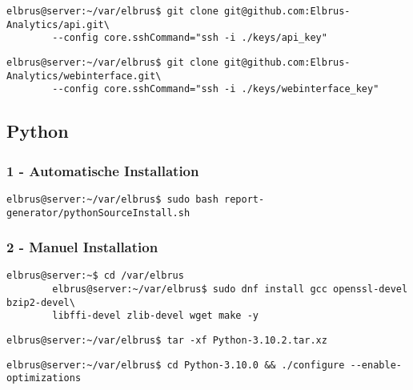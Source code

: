 \documentclass{article}
\begin{document}
	\begin{lstlisting}[caption={Clonen der API Software.}]
		elbrus@server:~/var/elbrus$ git clone git@github.com:Elbrus-Analytics/api.git\
		--config core.sshCommand="ssh -i ./keys/api_key"
	\end{lstlisting}

	\begin{lstlisting}[caption={Clonen der Packet-Importer Software}]
		elbrus@server:~/var/elbrus$ git clone git@github.com:Elbrus-Analytics/webinterface.git\
		--config core.sshCommand="ssh -i ./keys/webinterface_key"
	\end{lstlisting}

	\newpage
	\subsection{Python}
	\lstset{style=commands}
	\subsubsection{1 - Automatische Installation}

	\begin{lstlisting}[caption={Ausführen des 'pythonSourceInstall.sh' Scripts.}]
		elbrus@server:~/var/elbrus$ sudo bash report-generator/pythonSourceInstall.sh
	\end{lstlisting}
	
	\subsubsection{2 - Manuel Installation}
	\begin{lstlisting}[caption={Installieren von benötigten Packeten und Abhängigkeiten.}]
		elbrus@server:~$ cd /var/elbrus
		elbrus@server:~/var/elbrus$ sudo dnf install gcc openssl-devel bzip2-devel\
		libffi-devel zlib-devel wget make -y
	\end{lstlisting}
	
	\begin{lstlisting}[caption={Extrahieren der installierent Dateien.}]
		elbrus@server:~/var/elbrus$ tar -xf Python-3.10.2.tar.xz
	\end{lstlisting}
	
	\begin{lstlisting}[caption={Wechseln zu source Verzeichniss. Und ausführen des Konfigurations Scripts.}]
		elbrus@server:~/var/elbrus$ cd Python-3.10.0 && ./configure --enable-optimizations
	\end{lstlisting}
\end{document}
